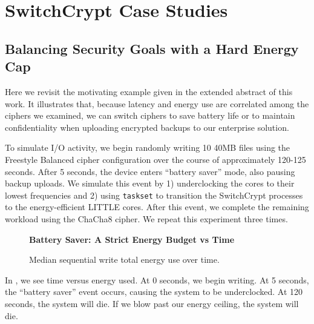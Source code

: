 \section{SwitchCrypt Case Studies} \label{sec:usecases}


\subsection{Balancing Security Goals with a Hard Energy Cap} \label{subsec:uc1}

Here we revisit the motivating example given in the extended abstract of this
work. It illustrates that, because latency and energy use are correlated among
the ciphers we examined, we can switch ciphers to save battery life or to
maintain confidentiality when uploading encrypted backups to our enterprise
solution.

To simulate I/O activity, we begin randomly writing 10 40MB files using the
Freestyle Balanced cipher configuration over the course of approximately 120-125
seconds. After 5 seconds, the device enters ``battery saver'' mode, also pausing
backup uploads. We simulate this event by 1) underclocking the cores to their
lowest frequencies and 2) using \texttt{taskset} to transition the SwitchCrypt
processes to the energy-efficient LITTLE cores. After this event, we complete
the remaining workload using the ChaCha8 cipher. We repeat this experiment three
times.

\begin{figure}[ht] \textbf{Battery Saver: A Strict Energy
   Budget vs Time}\par\medskip
   \centering
   {} \caption{Median sequential write total
   energy use over time.}
  \label{fig:usecase-battery}
\end{figure}

In , we see time versus energy used. At 0 seconds, we
begin writing. At 5 seconds, the ``battery saver'' event occurs, causing the
system to be underclocked. At 120 seconds, the system will die. If we blow past
our energy ceiling, the system will die.

